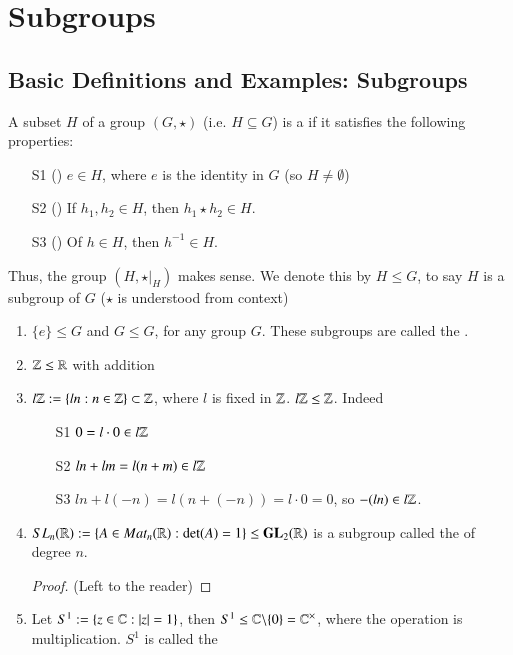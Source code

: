 \chapter{ Subgroups}
\label{Subgroups}
\section{ Basic Definitions and Examples: Subgroups}

\begin{definition}
    A subset $H$ of a group $(G,\star)$ (i.e. $H \subseteq G$) is a  if it satisfies the following properties:
    \begin{enumerate}
        \item[S1] () $e \in H$, where $e$ is the identity in $G$ (so $H \neq \emptyset$)
        \item[S2] () If $h_1,h_2 \in H$, then $h_1\star h_2 \in H$.
        \item[S3] () Of $h \in H$, then $h^{-1} \in H$.
    \end{enumerate}
    Thus, the group $(H,\star\vert_{H})$ makes sense. We denote this by $H \leq G$, to say $H$ is a subgroup of $G$ ($\star$ is understood from context)
\end{definition}

\begin{example}
    \leavevmode
    \begin{enumerate}
        \item $\{e\} \leq G$ and $G \leq G$, for any group $G$. These subgroups are called the .
        \item $\mathbb Z\leq \mathbb R$ with addition
        \item $l\mathbb Z := \{ln:n \in \mathbb Z\}\subset \mathbb Z$, where $l$ is fixed in $\mathbb Z$. $l\mathbb Z \leq \mathbb Z$. Indeed \begin{enumerate}
            \item[S1] $0 = l\cdot 0 \in l\mathbb Z$
            \item[S2] $ln+lm = l(n+m) \in l\mathbb Z$
            \item[S3] $ln + l(-n) = l(n+(-n)) = l\cdot 0 = 0$, so $-(ln) \in l\mathbb Z$.
        \end{enumerate}
        \item $SL_n(\mathbb R) := \{A \in Mat_n(\mathbb R):\det(A) = 1\} \leq \mathbf{GL}_2(\mathbb R)$ is a subgroup called the  of degree $n$.
        \begin{proof}
            (Left to the reader)
        \end{proof}
        \item Let $S^1 := \{z \in \mathbb C:|z| = 1\}$, then $S^1 \leq \mathbb C\backslash\{0\} = \mathbb C^{\times}$, where the operation is multiplication. $S^1$ is called the 
    \end{enumerate}
\end{example}


